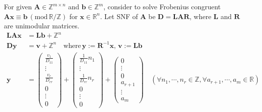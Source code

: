 For given $\bm{A} \in \mathbb{Z}^{m \times n}$ and $\bm{b} \in \mathbb{Z}^{m}$, consider to solve Frobenius congruent $\bm{Ax} \equiv \bm{b} \, (\mathrm{mod}\, \mathbb{R}/\mathbb{Z})$ for $\bm{x} \in \mathbb{R}^{n}$.
Let SNF of $\bm{A}$ be $\bm{D} = \bm{LAR}$, where $\bm{L}$ and $\bm{R}$ are unimodular matrices.
\begin{align}
  \bm{LAx} &= \bm{Lb} + \mathbb{Z}^{n} \\
  \bm{Dy}  &= \bm{v} + \mathbb{Z}^{n} \quad \mbox{where}\, \bm{y}:= \bm{R}^{-1} \bm{x},\, \bm{v}:= \bm{Lb} \\
  \bm{y}
    &= \begin{pmatrix} \frac{v_{1}}{D_{11}} \\ \vdots \\ \frac{v_{r}}{D_{rr}} \\ 0 \\ \vdots \\ 0 \end{pmatrix}
        + \begin{pmatrix} \frac{1}{D_{11}} n_{1} \\ \vdots \\ \frac{1}{D_{rr}} n_{r} \\ 0 \\ \vdots \\ 0 \end{pmatrix}
        + \begin{pmatrix} 0 \\ \vdots \\ 0 \\ a_{r+1} \\ \vdots \\ a_{m} \end{pmatrix}
        \quad (\forall n_{1}, \cdots, n_{r} \in \mathbb{Z}, \forall a_{r+1}, \cdots, a_{m} \in \mathbb{R})
\end{align}

